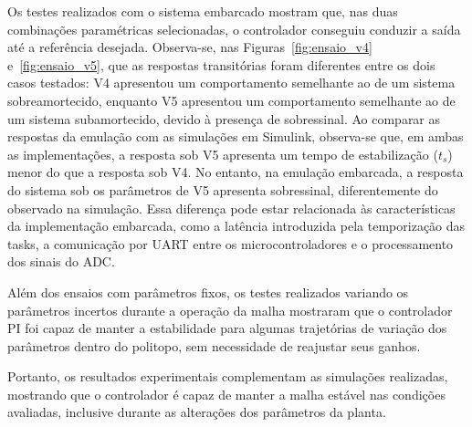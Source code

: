 Os testes realizados com o sistema embarcado mostram que, nas duas combinações paramétricas selecionadas, o controlador conseguiu conduzir a saída até a referência desejada. Observa-se, nas Figuras~\ref{fig:ensaio_v4} e~\ref{fig:ensaio_v5}, que as respostas transitórias foram diferentes entre os dois casos testados: V4 apresentou um comportamento semelhante ao de um sistema sobreamortecido, enquanto V5 apresentou um comportamento semelhante ao de um sistema subamortecido, devido à presença de sobressinal. Ao comparar as respostas da emulação com as simulações em Simulink, observa-se que, em ambas as implementações, a resposta sob V5 apresenta um tempo de estabilização ($t_s$) menor do que a resposta sob V4. No entanto, na emulação embarcada, a resposta do sistema sob os parâmetros de V5 apresenta sobressinal, diferentemente do observado na simulação. Essa diferença pode estar relacionada às características da implementação embarcada, como a latência introduzida pela temporização das tasks, a comunicação por UART entre os microcontroladores e o processamento dos sinais do ADC.

Além dos ensaios com parâmetros fixos, os testes realizados variando os parâmetros incertos durante a operação da malha mostraram que o controlador PI foi capaz de manter a estabilidade para algumas trajetórias de variação dos parâmetros dentro do politopo, sem necessidade de reajustar seus ganhos.

Portanto, os resultados experimentais complementam as simulações realizadas, mostrando que o controlador é capaz de manter a malha estável nas condições avaliadas, inclusive durante as alterações dos parâmetros da planta.



